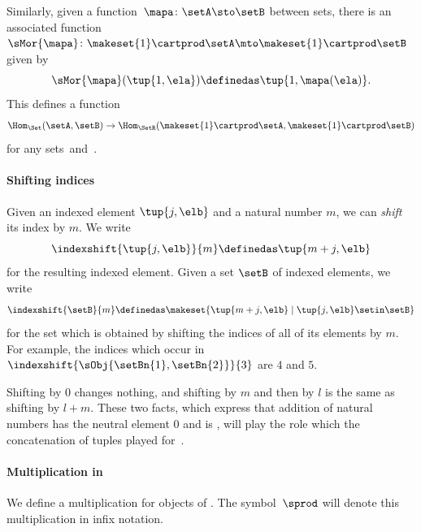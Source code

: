 Similarly, given a function~$\mapa \colon \setA \sto \setB$ between sets, there is an associated function~$\sMor{ \mapa }\colon \makeset{1} \cartprod \setA \mto \makeset{1} \cartprod \setB$ given by
\begin{equation}
    \label{eq:functionintosetrmor}
    \sMor{ \mapa } ( \tup{1, \ela }) \definedas \tup{1, \mapa(\ela)}.
\end{equation}
This defines a function
\begin{equation}
    \label{eq:functionintosetrmorfun}
    \Hom_{\Set}(\setA,\setB) \to \Hom_{\SetR}(\makeset{1} \cartprod \setA, \makeset{1} \cartprod \setB)
\end{equation}
for any sets~\setA and~\setB.

\paragraph{Shifting indices}

Given an indexed element $\tup{j, \elb}$ and a natural number $m$, we can \emph{shift} its index by $m$.
We write
\begin{equation}
    \label{eq:index-shift-element}
    \indexshift{\tup{j, \elb}}{m} \definedas \tup{m + j, \elb}
\end{equation}
for the resulting indexed element.
Given a set $\setB$ of indexed elements, we write
\begin{equation}
    \label{eq:index-shift-set}
    \indexshift{\setB}{m} \definedas \makeset{ \tup{m + j, \elb} \mid \tup{j, \elb} \setin \setB }
\end{equation}
for the set which is obtained by shifting the indices of all of its elements by $m$.
For example, the indices which occur in $\indexshift{\sObj{\setBn{1}, \setBn{2}}}{3}$ are $4$ and $5$.

Shifting by $0$ changes nothing, and shifting by $m$ and then by $l$ is the same as shifting by $l + m$.
These two facts, which express that addition of natural numbers has the neutral element $0$ and is , will play the role which the concatenation of tuples played for~\SetL.

\paragraph{Multiplication in \SetR}
\label{sec:multiplication-for-SetR}
We define a multiplication for objects of \SetR.
The symbol~$\sprod$ will denote this multiplication in infix notation.

